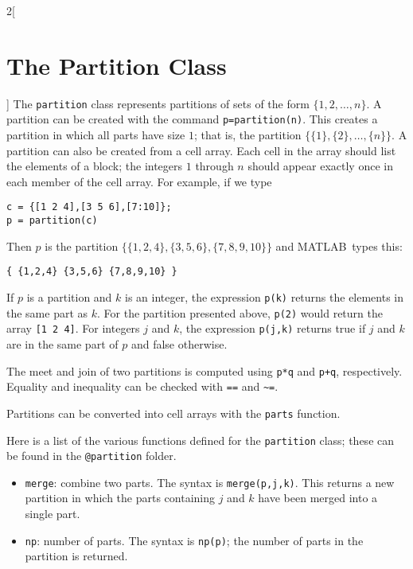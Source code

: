 \documentclass{amsart}
\newcommand\matlab{MATLAB}
\begin{document}
\begin{multicols}{2}[\section{The Partition Class}]
\label{sect:partition}
The \verb|partition| class represents partitions of sets of the form
$\{1,2,\ldots,n\}$. A partition can be created with the command
\verb|p=partition(n)|. This creates a partition in which all parts
have size $1$; that is, the partition
$\bigl\{\{1\},\{2\},\ldots,\{n\}\bigr\}$. A partition can also be
created from a cell array. Each cell in the array should list the
elements of a block; the integers $1$ through $n$ should appear
exactly once in each member of the cell array. For example, if we type
\begin{verbatim}
c = {[1 2 4],[3 5 6],[7:10]};
p = partition(c)
\end{verbatim}
Then $p$ is the partition
$\bigl\{\{1,2,4\},\{3,5,6\},\{7,8,9,10\}\bigr\}$ and \matlab\ types
this:
\begin{verbatim}
{ {1,2,4} {3,5,6} {7,8,9,10} }
\end{verbatim}

If $p$ is a partition and $k$ is an integer, the expression
\verb|p(k)| returns the elements in the same part as $k$. For the
partition presented above, \verb|p(2)| would return the array
\verb|[1 2 4]|.  For integers $j$ and $k$, the expression
\verb|p(j,k)| returns true if $j$ and $k$ are in the same part of $p$
and false otherwise.

The meet and join of two partitions is computed using \verb|p*q| and
\verb|p+q|, respectively. Equality and inequality can be checked with
\verb|==| and \verb|~=|.

Partitions can be converted into cell arrays with the \verb|parts|
function. 

Here is a list of the various functions defined for the
\verb|partition| class; these can be found in the \verb|@partition|
folder.

\begin{itemize}

\item \verb|merge|: combine two parts. The syntax is
  \verb|merge(p,j,k)|. This returns a new partition in which the parts
  containing $j$ and $k$ have been merged into a single part. 


\item \verb|np|: number of parts. The syntax is \verb|np(p)|; the
  number of parts in the partition is returned.


\end{itemize}
\end{multicols}
\end{document}

